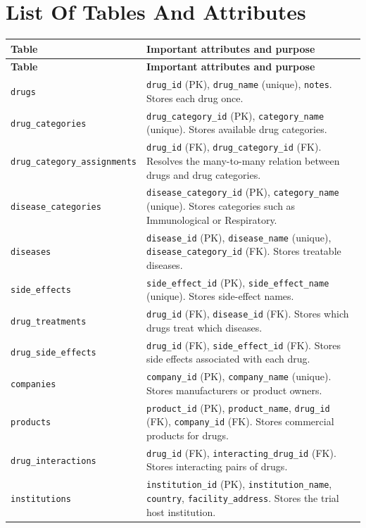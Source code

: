 \documentclass[12pt,a4paper]{article}
\begin{document}
\section{List Of Tables And Attributes}
\renewcommand{\arraystretch}{1.18}
\begin{longtable}{p{} p{}}
\toprule
\textbf{Table} & \textbf{Important attributes and purpose} \\
\midrule
\endfirsthead
\toprule
\textbf{Table} & \textbf{Important attributes and purpose} \\
\midrule
\endhead
\texttt{drugs} & \texttt{drug\_id} (PK), \texttt{drug\_name} (unique), \texttt{notes}. Stores each drug once. \\
\texttt{drug\_categories} & \texttt{drug\_category\_id} (PK), \texttt{category\_name} (unique). Stores available drug categories. \\
\texttt{drug\_category\_assignments} & \texttt{drug\_id} (FK), \texttt{drug\_category\_id} (FK). Resolves the many-to-many relation between drugs and drug categories. \\
\texttt{disease\_categories} & \texttt{disease\_category\_id} (PK), \texttt{category\_name} (unique). Stores categories such as Immunological or Respiratory. \\
\texttt{diseases} & \texttt{disease\_id} (PK), \texttt{disease\_name} (unique), \texttt{disease\_category\_id} (FK). Stores treatable diseases. \\
\texttt{side\_effects} & \texttt{side\_effect\_id} (PK), \texttt{side\_effect\_name} (unique). Stores side-effect names. \\
\texttt{drug\_treatments} & \texttt{drug\_id} (FK), \texttt{disease\_id} (FK). Stores which drugs treat which diseases. \\
\texttt{drug\_side\_effects} & \texttt{drug\_id} (FK), \texttt{side\_effect\_id} (FK). Stores side effects associated with each drug. \\
\texttt{companies} & \texttt{company\_id} (PK), \texttt{company\_name} (unique). Stores manufacturers or product owners. \\
\texttt{products} & \texttt{product\_id} (PK), \texttt{product\_name}, \texttt{drug\_id} (FK), \texttt{company\_id} (FK). Stores commercial products for drugs. \\
\texttt{drug\_interactions} & \texttt{drug\_id} (FK), \texttt{interacting\_drug\_id} (FK). Stores interacting pairs of drugs. \\
\texttt{institutions} & \texttt{institution\_id} (PK), \texttt{institution\_name}, \texttt{country}, \texttt{facility\_address}. Stores the trial host institution. \\

\end{longtable}
\end{document}
